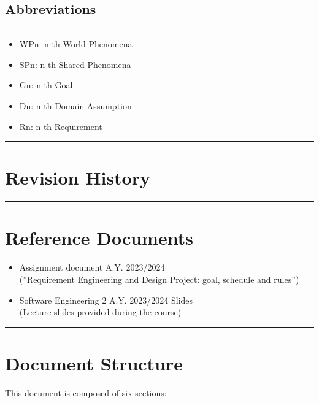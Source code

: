 \documentclass{Configuration_Files/Template}
\begin{document}
\subsection{Abbreviations}

{\color{bluepoli}\rule{\linewidth}{0.1pt}}

\begin{itemize}
\item \textcolor{bluepoli}{WPn:} n-th World Phenomena
\item \textcolor{bluepoli}{SPn:} n-th Shared Phenomena
\item \textcolor{bluepoli}{Gn:} n-th Goal
\item \textcolor{bluepoli}{Dn:} n-th Domain Assumption
\item \textcolor{bluepoli}{Rn:} n-th Requirement
\end{itemize}

{\color{bluepoli}\rule{\linewidth}{0.1pt}}

\section{Revision History}

{\color{bluepoli}\rule{\linewidth}{0.1pt}}

\section{Reference Documents}

\begin{itemize}
\item \textcolor{bluepoli}{Assignment document A.Y. 2023/2024}\\
(”Requirement Engineering and Design Project: goal, schedule and rules”)
\item \textcolor{bluepoli}{Software Engineering 2 A.Y. 2023/2024 Slides}\\
(Lecture slides provided during the course)
\end{itemize}

{\color{bluepoli}\rule{\linewidth}{0.1pt}}

\section{Document Structure}

This document is composed of six sections:
\end{document}
